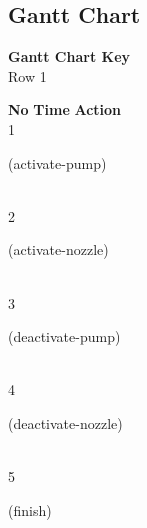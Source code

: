 \documentclass[a4paper,12pt]{article}
\newcommand{\action}[1]{{\sf #1}}
\newcommand{\listrowg}[1]{\begin{minipage}[t]{10cm} #1 \end{minipage}}
\begin{document}
\subsection{Gantt Chart}
{\bf Gantt Chart Key}\\
Row 1
\begin{tabbing}
{\bf No} \qquad \= {\bf Time} \qquad \= {\bf Action} \\
1  \> \listrowg{\action{(activate-pump)}} \\
2  \> \listrowg{\action{(activate-nozzle)}} \\
3  \> \listrowg{\action{(deactivate-pump)}} \\
4  \> \listrowg{\action{(deactivate-nozzle)}} \\
5  \> \listrowg{\action{(finish)}} \\
\end{tabbing}
\end{document}
